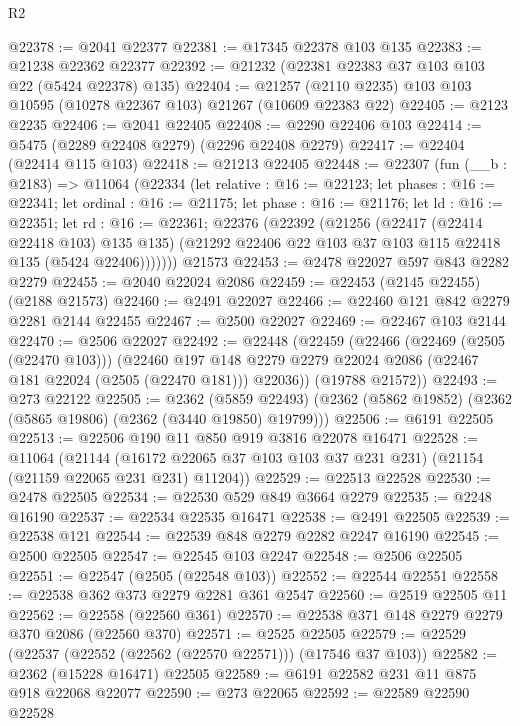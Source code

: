 \begin{lexlean}{R2}
\begin{coremodule}
@22378 := @2041 @22377
@22381 := @17345 @22378 @103 @135
@22383 := @21238 @22362 @22377
@22392 := @21232 (@22381 @22383 @37 @103 @103 @22 (@5424 @22378) @135)
@22404 := @21257 (@2110 @2235) @103 @103 @10595 (@10278 @22367 @103) @21267 (@10609 @22383 @22)
@22405 := @2123 @2235
@22406 := @2041 @22405
@22408 := @2290 @22406 @103
@22414 := @5475 (@2289 @22408 @2279) (@2296 @22408 @2279)
@22417 := @22404 (@22414 @115 @103)
@22418 := @21213 @22405
@22448 := @22307
    (fun (__b : @2183) =>
    @11064
      (@22334
        (let relative : @16 := @22123;
        let phases : @16 := @22341;
        let ordinal : @16 := @21175;
        let phase : @16 := @21176;
        let ld : @16 := @22351;
        let rd : @16 := @22361;
        @22376
          (@22392
            (@21256
              (@22417 (@22414 @22418 @103) @135 @135)
              (@21292 @22406 @22 @103 @37 @103 @115 @22418 @135 (@5424 @22406)))))))
    @21573
@22453 := @2478 @22027 @597 @843 @2282 @2279
@22455 := @2040 @22024 @2086
@22459 := @22453 (@2145 @22455) (@2188 @21573)
@22460 := @2491 @22027
@22466 := @22460 @121 @842 @2279 @2281 @2144 @22455
@22467 := @2500 @22027
@22469 := @22467 @103 @2144
@22470 := @2506 @22027
@22492 := @22448
    (@22459
      (@22466
        (@22469 (@2505 (@22470 @103)))
        (@22460
          @197
          @148
          @2279
          @2279
          @22024
          @2086
          (@22467 @181 @22024 (@2505 (@22470 @181)))
          @22036))
      (@19788 @21572))
@22493 := @273 @22122
@22505 := @2362
    (@5859 @22493)
    (@2362 (@5862 @19852) (@2362 (@5865 @19806) (@2362 (@3440 @19850) @19799)))
@22506 := @6191 @22505
@22513 := @22506 @190 @11 @850 @919 @3816 @22078 @16471
@22528 := @11064
    (@21144 (@16172 @22065 @37 @103 @103 @37 @231 @231) (@21154 (@21159 @22065 @231 @231) @11204))
@22529 := @22513 @22528
@22530 := @2478 @22505
@22534 := @22530 @529 @849 @3664 @2279
@22535 := @2248 @16190
@22537 := @22534 @22535 @16471
@22538 := @2491 @22505
@22539 := @22538 @121
@22544 := @22539 @848 @2279 @2282 @2247 @16190
@22545 := @2500 @22505
@22547 := @22545 @103 @2247
@22548 := @2506 @22505
@22551 := @22547 (@2505 (@22548 @103))
@22552 := @22544 @22551
@22558 := @22538 @362 @373 @2279 @2281 @361 @2547
@22560 := @2519 @22505 @11
@22562 := @22558 (@22560 @361)
@22570 := @22538 @371 @148 @2279 @2279 @370 @2086 (@22560 @370)
@22571 := @2525 @22505
@22579 := @22529 (@22537 (@22552 (@22562 (@22570 @22571))) (@17546 @37 @103))
@22582 := @2362 (@15228 @16471) @22505
@22589 := @6191 @22582 @231 @11 @875 @918 @22068 @22077
@22590 := @273 @22065
@22592 := @22589 @22590 @22528

\end{coremodule}
\end{lexlean}
